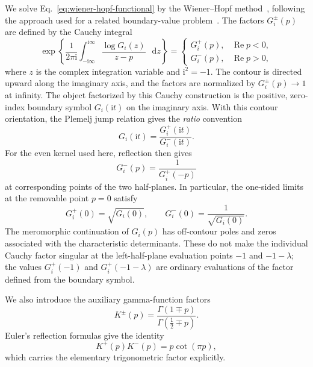 \documentclass[pdflatex,onecolumn,sn-mathphys-ay]{sn-jnl}
\newcommand{\dd}{\mathop{}\!\mathrm{d}}
\newcommand{\ii}{\mathrm{i}}
\begin{document}
We solve Eq.~\eqref{eq:wiener-hopf-functional} by the Wiener--Hopf
method~\citep{noble1958wienerhopf}, following the approach used for a related
boundary-value problem~\citep{KaminskyDudykPolishchuk2024}.
The factors $G_i^\pm(p)$ are defined by the Cauchy integral
\begin{equation*}
  \exp\left\{
    \frac{1}{2\pi\ii}
    \int_{-\ii\infty}^{\ii\infty}
      \frac{\log G_i(z)}{z-p}\,\dd z
  \right\}
  =
  \begin{cases}
    G_i^+(p), & \operatorname{Re}p<0,\\
    G_i^-(p), & \operatorname{Re}p>0,
  \end{cases}
\end{equation*}
where $z$ is the complex integration variable and $\ii^2=-1$.
The contour is directed upward along the imaginary axis, and the factors are
normalized by $G_i^\pm(p)\to1$ at infinity. The object factorized by this
Cauchy construction is the positive, zero-index boundary symbol
$G_i(\ii t)$ on the imaginary axis. With this contour orientation,
the Plemelj jump relation gives the \emph{ratio} convention
\begin{equation*}
  G_i(\ii t)=
  \frac{G_i^+(\ii t)}{G_i^-(\ii t)}.
\end{equation*}
For the even kernel used here, reflection then gives
\begin{equation}
\label{eq:factor-reflection}
  G_i^-(p)=\frac{1}{G_i^+(-p)}
\end{equation}
at corresponding points of the two half-planes. In particular, the
one-sided limits at the removable point $p=0$ satisfy
\begin{equation}
\label{eq:factor-zero}
  G_i^+(0)=\sqrt{G_i(0)},\qquad
  G_i^-(0)=\frac{1}{\sqrt{G_i(0)}}.
\end{equation}
The meromorphic continuation of $G_i(p)$ has off-contour poles and zeros
associated with the characteristic determinants. These do not make the
individual Cauchy factor singular at the left-half-plane evaluation points
$-1$ and $-1-\lambda$; the values $G_i^+(-1)$ and
$G_i^+(-1-\lambda)$ are ordinary evaluations of the factor defined from
the boundary symbol.

We also introduce the auxiliary gamma-function factors
\begin{equation*}
  K^\pm(p)=
  \frac{\Gamma(1\mp p)}{\Gamma(\tfrac12\mp p)}.
\end{equation*}
Euler's reflection formulas give the identity
\begin{equation}
\label{eq:gamma-factor-identity}
  K^+(p)K^-(p)=p\cot(\pi p),
\end{equation}
which carries the elementary trigonometric factor explicitly.
\end{document}
